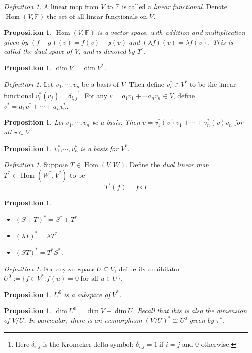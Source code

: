 \documentclass[12pt]{amsart}
\newcommand{\fff}[0]{\mathbb{F}}
\DeclareMathOperator{\Hom}{Hom}
\newtheorem{proposition}[theorem]{Proposition}
\theoremstyle{remark}
\newtheorem{definition}[theorem]{Definition}
\numberwithin{equation}{section}
\begin{document}
	\begin{definition}
		A linear map from $V$ to $\fff$ is called a \emph{linear functional}. Denote $\Hom(V,\fff)$ the set of all linear functionals on $V$.
	\end{definition}
	\begin{proposition}
		$\Hom(V,\fff)$ is a vector space, with addition and multiplication given by $(f+g)(v)=f(v)+g(v)$ and $(\lambda f)(v)=\lambda f(v)$. This is called the \emph{dual space} of $V$, and is denoted by $T^*$. 
	\end{proposition}
	\begin{proposition}
		$\dim V=\dim V^*$.
	\end{proposition}
	\begin{definition}
		Let $v_1,\cdots,v_n$ be a basis of $V$. Then define $v_i^*\in V^*$ to be the linear functional $v_i^*(v_j)=\delta_{i,j}$\footnote{Here $\delta_{i,j}$ is the Kronecker delta symbol: $\delta_{i,j}=1$ if $i=j$ and $0$ otherwise.}. For any $v=a_1v_1+\cdots a_nv_n\in V$, define $v^*=a_1v_1^*+\cdots+a_nv_n^*$.
	\end{definition}
	\begin{proposition}Let $v_1,\cdots,v_n$ be a basis. Then
		$v=v_1^*(v)v_1+\cdots+v_n^*(v)v_n$ for all $v\in V$.
	\end{proposition}
	\begin{proposition}
		$v_1^*,\cdots,v_n^*$ is a basis for $V^*$.
	\end{proposition}
	\begin{definition}
		Suppose $T\in \Hom(V,W)$. Define the \emph{dual linear map} $T^*\in\Hom(W^*,V^*)$ to be
		\[T^*(f) = f\circ T\]
	\end{definition}
	\begin{proposition}
	\begin{itemize}
		\item $(S+T)^* = S^*+T^*$
		\item $(\lambda T)^*=\lambda T^*$.
		\item $(ST)^*=T^*S^*$.
	\end{itemize}
		
	\end{proposition}
	\begin{definition}
		For any subspace $U\subseteq V$, define its annihilator $U^0:=\{f\in V^*: f(u)=0\text{ for all } u\in U\}$.
	\end{definition}
	\begin{proposition}
		$U^0$ is a subspace of $V^*$.
	\end{proposition}
	\begin{proposition}
		$\dim U^0=\dim V-\dim U$. Recall that this is also the dimension of $V/U$. In particular, there is an isomorphism $(V/U)^*\cong U^0$ given by $\pi^*$.
	\end{proposition}
	
\end{document}
